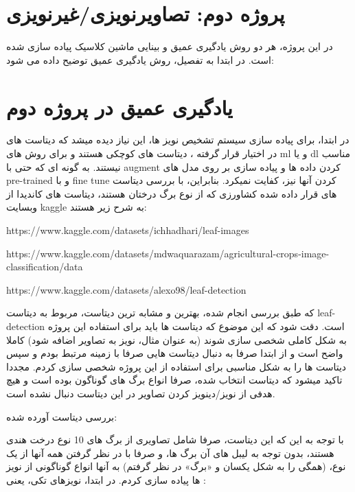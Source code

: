 \documentclass[a4paper,12pt]{article}
\begin{document}
\pagebreak
\section{پروژه دوم: تصاویرنویزی/غیرنویزی}
در این پروژه، هر دو روش یادگیری عمیق و بینایی ماشین کلاسیک پیاده سازی شده است. در ابتدا به تفصیل، روش یادگیری عمیق توضیح داده می شود:

\section{یادگیری عمیق در پروژه دوم}


در ابتدا، برای پیاده سازی سیستم تشخیص نویز ها، این نیاز دیده میشد که دیتاست های در اختیار قرار گرفته ، دیتاست های کوچکی هستند و برای روش های ml و یا dl مناسب نیستند. به گونه ای که حتی با augment کردن داده ها و پیاده سازی بر روی مدل های pre-trained و با fine tune کردن آنها نیز، کفایت نمیکرد.  بنابراین، با بررسی دیتاست های قرار داده شده کشاورزی که از نوع برگ درختان هستند، دیتاست های کاندیدا از وبسایت kaggle به شرح زیر هستند:
\begin{enumerate}
\end{enumerate}

که طبق بررسی انجام شده، بهترین و مشابه ترین دیتاست، مربوط به دیتاست leaf-detection است. 
دقت شود که این موضوع که دیتاست ها باید برای استفاده این پروژه به شکل کاملی شخصی سازی شوند (به عنوان مثال، نویز به تصاویر اضافه شود) کاملا واضح است و از ابتدا صرفا به دنبال دیتاست هایی صرفا با زمینه مرتبط بودم و سپس دیتاست ها را به شکل مناسبی برای استفاده از این پروژه شخصی سازی کردم. مجددا تاکید میشود که دیتاست انتخاب شده، صرفا انواع برگ های گوناگون بوده است و هیچ هدفی از نویز/دینویز کردن تصاویر در این دیتاست دنبال نشده است. 

بررسی دیتاست آورده شده:

با توجه به این که این دیتاست، صرفا شامل تصاویری از برگ های 10 نوع درخت هندی هستند، بدون توجه به لیبل های آن برگ ها، و صرفا با در نظر گرفتن همه آنها از یک نوع، (همگی را به شکل یکسان و «برگ» در نظر گرفتم) به آنها انواع گوناگونی از نویز ها پیاده سازی کردم. در ابتدا، نویزهای تکی، یعنی :
\end{document}
